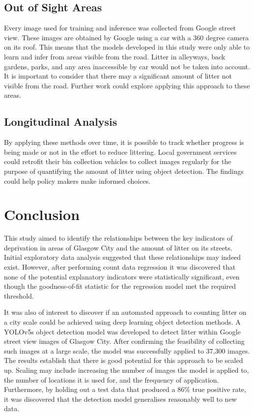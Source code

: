 \documentclass{thesis}
\begin{document}
\subsection{Out of Sight Areas}

Every image used for training and inference was collected from Google street view. These images are obtained by Google using a car with a 360 degree camera on its roof. This means that the models developed in this study were only able to learn and infer from areas visible from the road. Litter in alleyways, back gardens, parks, and any area inaccessible by car would not be taken into account. It is important to consider that there may a significant amount of litter not visible from the road. Further work could explore applying this approach to these areas.

\subsection{Longitudinal Analysis}

By applying these methods over time, it is possible to track whether progress is being made or not in the effort to reduce littering. Local government services could retrofit their bin collection vehicles to collect images regularly for the purpose of quantifying the amount of litter using object detection. The findings could help policy makers make informed choices.

\section{Conclusion}

This study aimed to identify the relationships between the key indicators of deprivation in areas of Glasgow City and the amount of litter on its streets. Initial exploratory data analysis suggested that these relationships may indeed exist. However, after performing count data regression it was discovered that none of the potential explanatory indicators were statistically significant, even though the goodness-of-fit statistic for the regression model met the required threshold.

It was also of interest to discover if an automated approach to counting litter on a city scale could be achieved using deep learning object detection methods. A YOLOv5s object detection model was developed to detect litter within Google street view images of Glasgow City. After confirming the feasibility of collecting such images at a large scale, the model was successfully applied to 37,300 images. The results establish that there is good potential for this approach to be scaled up. Scaling may include increasing the number of images the model is applied to, the number of locations it is used for, and the frequency of application. Furthermore, by holding out a test data that produced a 86\% true positive rate, it was discovered that the detection model generalises reasonably well to new data.
\end{document}
